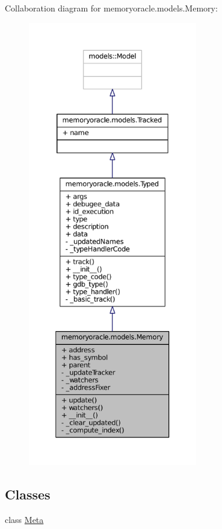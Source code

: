 Collaboration diagram for memoryoracle.\+models.\+Memory\+:\nopagebreak
\begin{figure}[H]
\begin{center}
\leavevmode
\includegraphics[height=550pt]{classmemoryoracle_1_1models_1_1Memory__coll__graph}
\end{center}
\end{figure}
\subsection*{Classes}
\begin{DoxyCompactItemize}
\item 
class \hyperlink{classmemoryoracle_1_1models_1_1Memory_1_1Meta}{Meta}
\end{DoxyCompactItemize}
